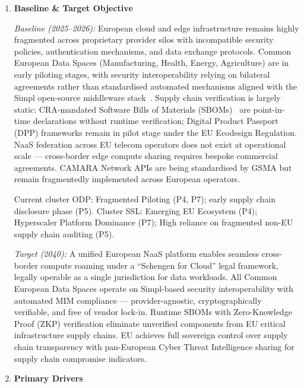\begin{enumerate}

\item \textbf{Baseline \& Target Objective}

\textit{Baseline (2025--2026):}
European cloud and edge infrastructure remains highly fragmented across proprietary provider
silos with incompatible security policies, authentication mechanisms, and data exchange
protocols. Common European Data Spaces (Manufacturing, Health, Energy, Agriculture) are in
early piloting stages, with security interoperability relying on bilateral agreements rather
than standardised automated mechanisms aligned with the Simpl open-source middleware
stack~\cite{cloud_edge_roadmap}. Supply chain verification is largely static: CRA-mandated
Software Bills of Materials (SBOMs)~\cite{cra} are point-in-time declarations without runtime
verification; Digital Product Passport (DPP) frameworks remain in pilot stage under the EU
Ecodesign Regulation. NaaS federation across EU telecom operators does not exist at
operational scale --- cross-border edge compute sharing requires bespoke commercial agreements.
CAMARA Network APIs are being standardised by GSMA but remain fragmentedly implemented
across European operators.

Current cluster ODP: Fragmented Piloting (P4, P7); early supply chain disclosure phase
(P5). Cluster SSL: Emerging EU Ecosystem (P4); Hyperscaler Platform Dominance (P7);
High reliance on fragmented non-EU supply chain auditing (P5).

\textit{Target (2040):}
A unified European NaaS platform enables seamless cross-border compute roaming under a
``Schengen for Cloud'' legal framework, legally operable as a single jurisdiction for
data workloads. All Common European Data Spaces operate on Simpl-based security
interoperability with automated MIM compliance --- provider-agnostic, cryptographically
verifiable, and free of vendor lock-in. Runtime SBOMs with Zero-Knowledge Proof (ZKP)
verification eliminate unverified components from EU critical infrastructure supply chains.
EU achieves full sovereign control over supply chain transparency with pan-European Cyber
Threat Intelligence sharing for supply chain compromise indicators.

\item \textbf{Primary Drivers}


\end{enumerate}
